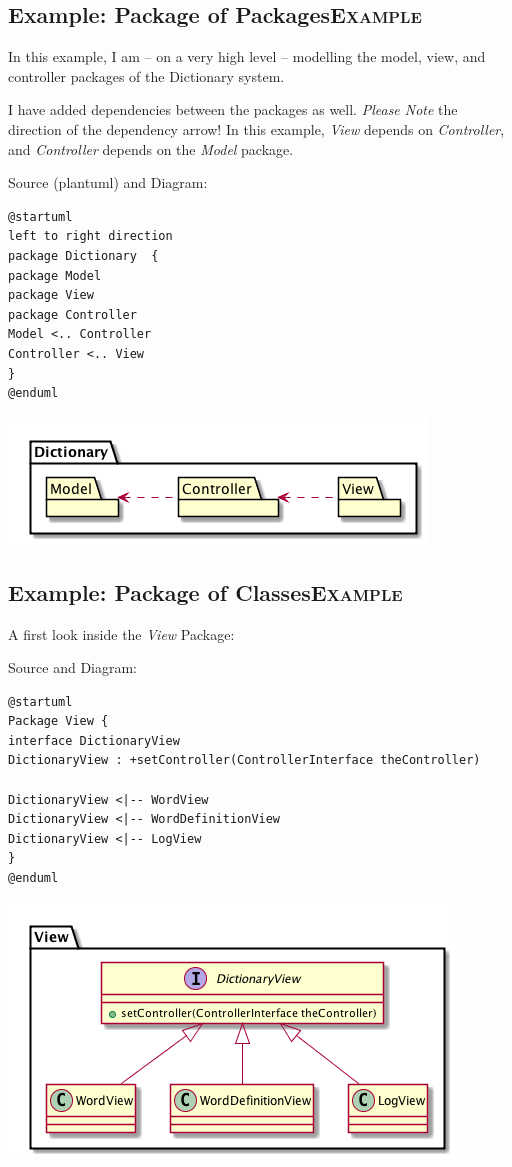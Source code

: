 \documentclass[10pt,t,a4paper]{article}
\begin{document}
\subsection{Example: Package of Packages\hfill{}\textsc{Example}}
\label{sec:orgheadline2}
In this example, I am -- on a very high level -- modelling the model, view, and controller packages of the Dictionary system.

I have added dependencies between the packages as well. \emph{Please Note} the direction of the dependency arrow! In this example, \emph{View} depends on \emph{Controller}, and \emph{Controller} depends on the \emph{Model} package.

Source (plantuml) and Diagram:
\begin{verbatim}
@startuml
left to right direction
package Dictionary  {
package Model
package View
package Controller
Model <.. Controller
Controller <.. View
}
@enduml
\end{verbatim}

\includegraphics[width=.9\linewidth]{FPackageNotation.png}

\subsection{Example: Package of Classes\hfill{}\textsc{Example}}
\label{sec:orgheadline3}

A first look inside the \emph{View} Package:

Source and Diagram:
\begin{verbatim}
@startuml
Package View {
interface DictionaryView
DictionaryView : +setController(ControllerInterface theController)

DictionaryView <|-- WordView
DictionaryView <|-- WordDefinitionView
DictionaryView <|-- LogView
}
@enduml
\end{verbatim}

\includegraphics[width=.9\linewidth]{FPackageOfClasses.png}
\end{document}
